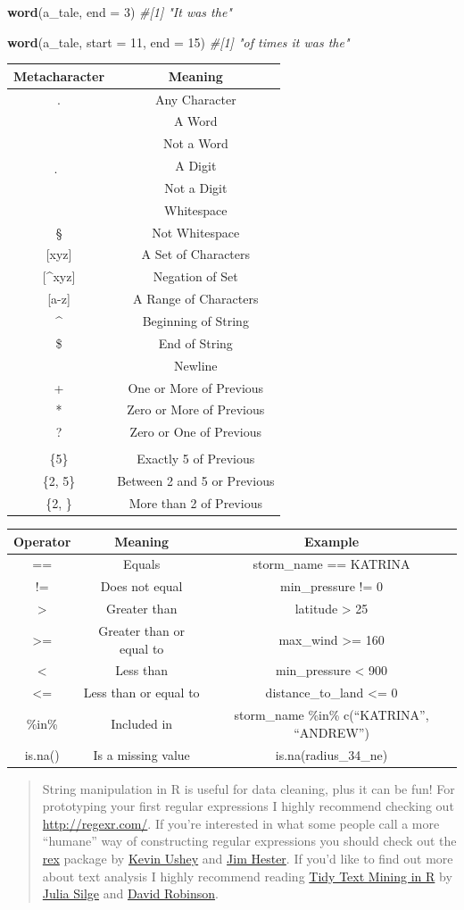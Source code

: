 \documentclass[]{book}
\newenvironment{Shaded}{\begin{snugshade}}{\end{snugshade}}
\newcommand{\KeywordTok}[1]{\textcolor[rgb]{0.13,0.29,0.53}{\textbf{#1}}}
\newcommand{\DataTypeTok}[1]{\textcolor[rgb]{0.13,0.29,0.53}{#1}}
\newcommand{\DecValTok}[1]{\textcolor[rgb]{0.00,0.00,0.81}{#1}}
\newcommand{\CommentTok}[1]{\textcolor[rgb]{0.56,0.35,0.01}{\textit{#1}}}
\newcommand{\NormalTok}[1]{#1}
\begin{document}
\begin{Shaded}
\begin{Highlighting}[]
\KeywordTok{word}\NormalTok{(a_tale, }\DataTypeTok{end =} \DecValTok{3}\NormalTok{)}
\CommentTok{#[1] "It was the"}

\KeywordTok{word}\NormalTok{(a_tale, }\DataTypeTok{start =} \DecValTok{11}\NormalTok{, }\DataTypeTok{end =} \DecValTok{15}\NormalTok{)}
\CommentTok{#[1] "of times it was the"}
\end{Highlighting}
\end{Shaded}

\begin{longtable}[]{@{}cc@{}}
\toprule
Metacharacter & Meaning\tabularnewline
\midrule
\endhead
. & Any Character\tabularnewline
\w & A Word\tabularnewline
\W & Not a Word\tabularnewline
\d & A Digit\tabularnewline
\D & Not a Digit\tabularnewline
\s & Whitespace\tabularnewline
\S & Not Whitespace\tabularnewline
{[}xyz{]} & A Set of Characters\tabularnewline
{[}\^{}xyz{]} & Negation of Set\tabularnewline
{[}a-z{]} & A Range of Characters\tabularnewline
\^{} & Beginning of String\tabularnewline
\$ & End of String\tabularnewline
\n & Newline\tabularnewline
+ & One or More of Previous\tabularnewline
* & Zero or More of Previous\tabularnewline
? & Zero or One of Previous\tabularnewline
&\tabularnewline
\{5\} & Exactly 5 of Previous\tabularnewline
\{2, 5\} & Between 2 and 5 or Previous\tabularnewline
\{2, \} & More than 2 of Previous\tabularnewline
\bottomrule
\end{longtable}

\begin{longtable}[]{@{}ccc@{}}
\toprule
Operator & Meaning & Example\tabularnewline
\midrule
\endhead
== & Equals & storm\_name == KATRINA\tabularnewline
!= & Does not equal & min\_pressure != 0\tabularnewline
\textgreater{} & Greater than & latitude \textgreater{}
25\tabularnewline
\textgreater{}= & Greater than or equal to & max\_wind \textgreater{}=
160\tabularnewline
\textless{} & Less than & min\_pressure \textless{} 900\tabularnewline
\textless{}= & Less than or equal to & distance\_to\_land \textless{}=
0\tabularnewline
\%in\% & Included in & storm\_name \%in\% c(``KATRINA'',
``ANDREW'')\tabularnewline
is.na() & Is a missing value & is.na(radius\_34\_ne)\tabularnewline
\bottomrule
\end{longtable}

\begin{quote}
String manipulation in R is useful for data cleaning, plus it can be
fun! For prototyping your first regular expressions I highly recommend
checking out \url{http://regexr.com/}. If you're interested in what some
people call a more ``humane'' way of constructing regular expressions
you should check out the \href{https://github.com/kevinushey/rex}{rex}
package by \href{https://github.com/kevinushey}{Kevin Ushey} and
\href{http://www.jimhester.com/}{Jim Hester}. If you'd like to find out
more about text analysis I highly recommend reading
\href{http://tidytextmining.com/}{Tidy Text Mining in R} by
\href{http://juliasilge.com/}{Julia Silge} and
\href{http://varianceexplained.org/}{David Robinson}.
\end{quote}
\end{document}
